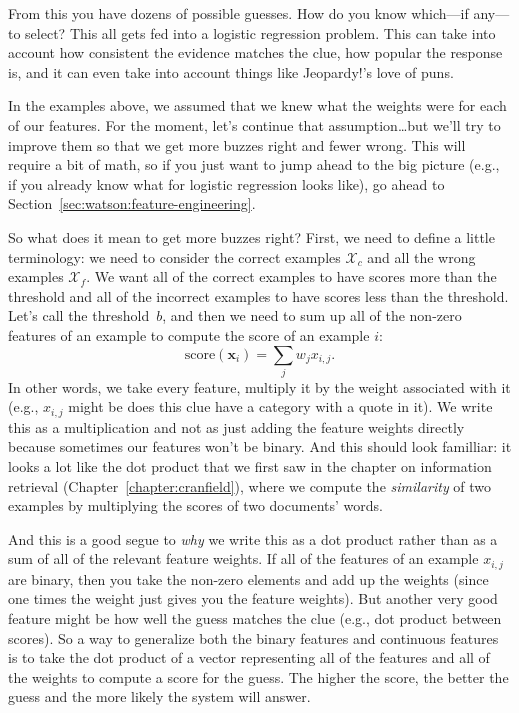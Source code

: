 From this you have dozens of possible guesses.  How do you know which---if
any—to select?  This all gets fed into a logistic regression problem.  This
can take into account how consistent the evidence matches the clue, how
popular the response is, and it can even take into account things like
Jeopardy!’s love of puns.

In the examples above, we assumed that we knew what the weights were for each
of our features.
%
For the moment, let's continue that assumption\dots but we'll try to improve
them so that we get more buzzes right and fewer wrong.
%
This will require a bit of math, so if you just want to jump ahead to the big
picture (e.g., if you already know what  for logistic regression
looks like), go ahead to Section~\ref{sec:watson:feature-engineering}.

So what does it mean to get more buzzes right?  First, we need to define a
little terminology: we need to consider the correct examples $\mathcal{X}_c$
and all the wrong examples $\mathcal{X}_f$.
%
We want all of the correct examples to have scores more than the threshold and
all of the incorrect examples to have scores less than the threshold.
%
Let's call the threshold~$b$, and then we need to sum up all of the non-zero
features of an example to compute the score of an example $i$:
\begin{equation}
  \mbox{score}({\bm x}_i) = \sum_{j} w_j x_{i,j}.
  \label{eq:lr-dot}
\end{equation}
In other words, we take every feature, multiply it by the weight associated
with it (e.g., $x_{i,j}$ might be does this clue have a category with a quote
in it).
%
We write this as a multiplication and not as just adding the feature weights
directly because sometimes our features won't be binary.
%
And this should look familliar: it looks a lot like the dot product that we
first saw in the chapter on information retrieval
(Chapter~\ref{chapter:cranfield}), where we compute the \emph{similarity} of
two examples by multiplying the \tfidf{} scores of two documents' words.

And this is a good segue to \emph{why} we write this as a dot product rather
than as a sum of all of the relevant feature weights.
%
If all of the features of an example $x_{i,j}$ are binary, then you take the
non-zero elements and add up the weights (since one times the weight just
gives you the feature weights).
%
But another very good feature might be how well the guess matches the clue
(e.g., dot product between \tfidf{} scores).
%
So a way to generalize both the binary features and continuous features is to
take the dot product of a vector representing all of the features and all of
the weights to compute a score for the guess.
%
The higher the score, the better the guess and the more likely the system will
answer.

